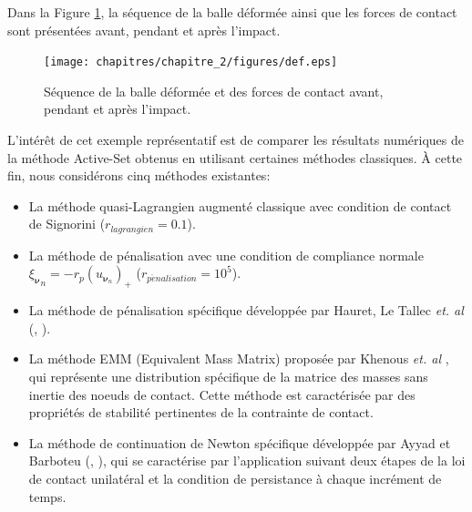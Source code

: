 Dans la Figure \ref{defcont}, la séquence de la balle déformée
ainsi que les forces de contact sont présentées avant, pendant et
après l'impact.\\
\begin{figure}[!h]
	\begin{center}
		\texttt{[image: chapitres/chapitre\_2/figures/def.eps]}
	\end{center}
	\caption{Séquence de la balle déformée et des forces de contact avant, pendant et après l'impact.}\label{defcont}
\end{figure}
L'intérêt de cet exemple représentatif est de comparer les résultats numériques de la méthode Active-Set obtenus en utilisant certaines méthodes classiques. À cette fin, nous considérons cinq méthodes existantes: 
\begin{itemize}
    \item La méthode quasi-Lagrangien augmenté classique avec condition de contact de Signorini ($r_{lagrangien} = 0.1$).
    \item La méthode de pénalisation avec une condition de compliance normale ${\xi_{{\boldsymbol \nu}}}_{n} = - r _p({u}_{{\boldsymbol \nu}_{n}})_+$ ($r_{p\acute{e}nalisation} = 10^5$).
    \item La méthode de pénalisation spécifique développée par Hauret, Le Tallec {\it et. al} (\cite{ayyad2009formulation}, \cite{hauret2006energy}).
    \item La méthode EMM (Equivalent Mass Matrix) proposée par Khenous {\it et. al} \cite{khenous2006discretization}, qui représente une distribution spécifique de la matrice des masses sans inertie des noeuds de contact. Cette méthode est caractérisée par des propriétés de stabilité pertinentes de la contrainte de contact.
    \item La méthode de continuation de Newton spécifique développée par Ayyad et Barboteu (\cite{ayyad2009formulation}, \cite{barboteu2015hyperelastic}), qui se caractérise par l'application suivant deux étapes de la loi de contact unilatéral et la condition de persistance à chaque incrément de temps.
\end{itemize} 

